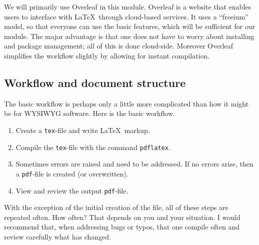 \documentclass[a4paper, 12pt]{article}
\numberwithin{equation}{section}
\numberwithin{figure}{section}
\theoremstyle{definition}
\begin{document}
We will primarily use Overleaf in this module. Overleaf is a website that
enables users to interface with \LaTeX\ through cloud-based services. It uses a
``freeium'' model, so that everyone can use the basic features, which will be
sufficient for our module. The major advantage is that one does not have to
worry about installing and package management; all of this is done cloud-side.
Moreover Overleaf simplifies the workflow slightly by allowing for instant
compilation. 

\subsection{Workflow and document structure}
\label{sec:workflow}

The basic workflow is perhaps only a little more complicated than how it might
be for WYSIWYG software. Here is the basic workflow. 
\begin{enumerate}
	\item Create a \texttt{tex}-file and write \LaTeX\ markup. 
	\item Compile the \texttt{tex}-file with the command \texttt{pdflatex}.
	\item Sometimes errors are raised and need to be addressed. If no errors
	arise, then a \texttt{pdf}-file is created (or overwritten).
	\item View and review the output \texttt{pdf}-file. 
\end{enumerate}
With the exception of the initial creation of the file, all of these steps are
repeated often. How often? That depends on you and your situation. I would
recommend that, when addressing bugs or typos, that one compile often and review
carefully what has changed. 
\end{document}
